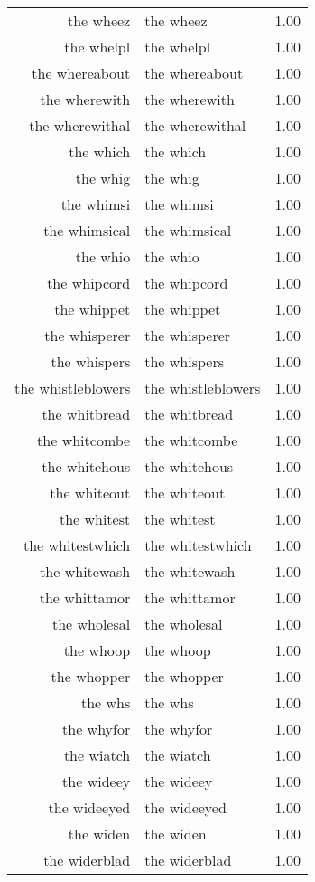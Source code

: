 \begin{table}[ht]
\begin{tabular}{rlr}
  the wheez & the wheez & 1.00 \\ 
  the whelpl & the whelpl & 1.00 \\ 
  the whereabout & the whereabout & 1.00 \\ 
  the wherewith & the wherewith & 1.00 \\ 
  the wherewithal & the wherewithal & 1.00 \\ 
  the which & the which & 1.00 \\ 
  the whig & the whig & 1.00 \\ 
  the whimsi & the whimsi & 1.00 \\ 
  the whimsical & the whimsical & 1.00 \\ 
  the whio & the whio & 1.00 \\ 
  the whipcord & the whipcord & 1.00 \\ 
  the whippet & the whippet & 1.00 \\ 
  the whisperer & the whisperer & 1.00 \\ 
  the whispers & the whispers & 1.00 \\ 
  the whistleblowers & the whistleblowers & 1.00 \\ 
  the whitbread & the whitbread & 1.00 \\ 
  the whitcombe & the whitcombe & 1.00 \\ 
  the whitehous & the whitehous & 1.00 \\ 
  the whiteout & the whiteout & 1.00 \\ 
  the whitest & the whitest & 1.00 \\ 
  the whitestwhich & the whitestwhich & 1.00 \\ 
  the whitewash & the whitewash & 1.00 \\ 
  the whittamor & the whittamor & 1.00 \\ 
  the wholesal & the wholesal & 1.00 \\ 
  the whoop & the whoop & 1.00 \\ 
  the whopper & the whopper & 1.00 \\ 
  the whs & the whs & 1.00 \\ 
  the whyfor & the whyfor & 1.00 \\ 
  the wiatch & the wiatch & 1.00 \\ 
  the wideey & the wideey & 1.00 \\ 
  the wideeyed & the wideeyed & 1.00 \\ 
  the widen & the widen & 1.00 \\ 
  the widerblad & the widerblad & 1.00 \\ 

\end{tabular}
\end{table}
